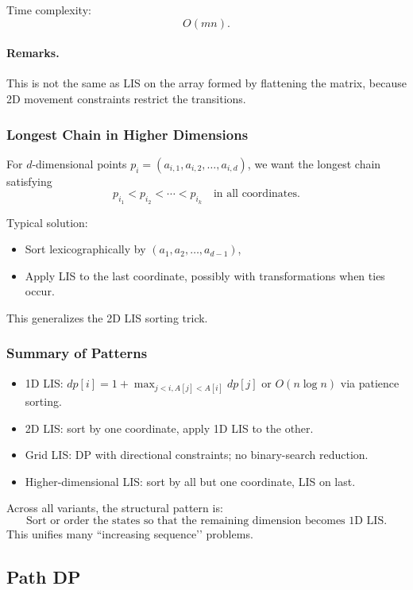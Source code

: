 \documentclass[9pt]{extarticle}
\begin{document}
Time complexity:
\[
O(mn).
\]

\paragraph{Remarks.}
This is not the same as LIS on the array formed by flattening the matrix,
because 2D movement constraints restrict the transitions.

\subsubsection{Longest Chain in Higher Dimensions}

For $d$-dimensional points $p_i = (a_{i,1},a_{i,2},\dots,a_{i,d})$, we want the
longest chain satisfying
\[
p_{i_1} < p_{i_2} < \cdots < p_{i_k}
\quad\text{in all coordinates}.
\]

Typical solution:
\begin{itemize}
    \item Sort lexicographically by $(a_{1},a_{2},\dots,a_{d-1})$,
    \item Apply LIS to the last coordinate, possibly with transformations when
          ties occur.
\end{itemize}

This generalizes the 2D LIS sorting trick.

\subsubsection{Summary of Patterns}

\begin{itemize}
    \item 1D LIS: $dp[i] = 1 + \max_{j<i, A[j]<A[i]} dp[j]$ or 
          $O(n\log n)$ via patience sorting.
    \item 2D LIS: sort by one coordinate, apply 1D LIS to the other.
    \item Grid LIS: DP with directional constraints; no binary-search reduction.
    \item Higher-dimensional LIS: sort by all but one coordinate, LIS on last.
\end{itemize}

Across all variants, the structural pattern is:
\[
\text{Sort or order the states so that the remaining dimension becomes 1D LIS.}
\]
This unifies many “increasing sequence’’ problems.

\subsection{Path DP}
\end{document}
